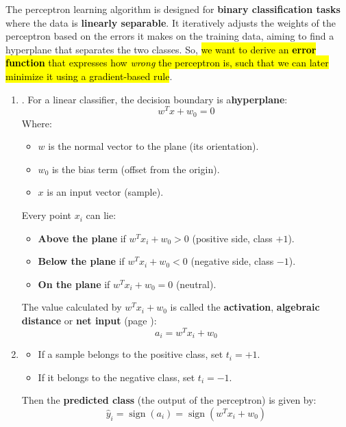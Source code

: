 \highspace
The perceptron learning algorithm is designed for \textbf{binary classification tasks} where the data is \textbf{linearly separable}. It iteratively adjusts the weights of the perceptron based on the errors it makes on the training data, aiming to find a hyperplane that separates the two classes. So, \hl{we want to derive an \textbf{error function} that expresses how \emph{wrong} the perceptron is, such that we can later minimize it using a gradient-based rule}.
\begin{enumerate}
    \item {}. For a linear classifier, the decision boundary is a\textbf{hyperplane}:
    \begin{equation*}
        w^{T} x + w_{0} = 0
    \end{equation*}
    Where:
    \begin{itemize}
        \item $w$ is the normal vector to the plane (its orientation).
        \item $w_{0}$ is the bias term (offset from the origin).
        \item $x$ is an input vector (sample).
    \end{itemize}
    Every point $x_i$ can lie:
    \begin{itemize}
        \item \textbf{Above the plane} if $w^{T} x_i + w_{0} > 0$ (positive side, class $+1$).
        \item \textbf{Below the plane} if $w^{T} x_i + w_{0} < 0$ (negative side, class $-1$).
        \item \textbf{On the plane} if $w^{T} x_i + w_{0} = 0$ (neutral).
    \end{itemize}
    The value calculated by $w^{T} x_i + w_{0}$ is called the \textbf{activation}, \textbf{algebraic distance} or \textbf{net input} (page \pageref{eq:net-input}):
    \begin{equation*}
        a_i = w^{T} x_i + w_{0}
    \end{equation*}
    

    \item {}
    \begin{itemize}
        \item If a sample belongs to the positive class, set $t_i = +1$.
        \item If it belongs to the negative class, set $t_i = -1$.
    \end{itemize}
    Then the \textbf{predicted class} (the output of the perceptron) is given by:
    \begin{equation*}
        \hat{y}_i = \operatorname{sign}\left(a_i\right) = \operatorname{sign}\left(w^{T} x_i + w_{0}\right)
    \end{equation*}
    


\end{enumerate}
